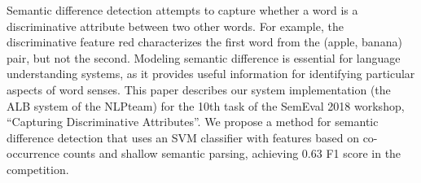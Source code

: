 Semantic difference detection attempts to capture whether a word is a discriminative attribute between two other words. For example, the discriminative feature red characterizes the first word from the (apple, banana) pair, but not the second. Modeling semantic difference is essential for language understanding systems, as it provides useful information for identifying particular aspects of word senses. This paper describes our system implementation (the ALB system of the NLP\@Unibuc team) for the 10th task of the SemEval 2018 workshop, ``Capturing Discriminative Attributes''. We propose a method for semantic difference detection that uses an SVM classifier with features based on co-occurrence counts and shallow semantic parsing, achieving 0.63 F1 score in the competition.
